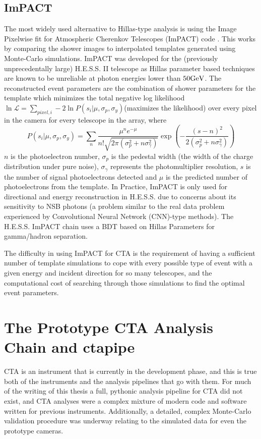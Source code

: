 \subsection{ImPACT}
The most widely used alternative to Hillas-type analysis is using the Image Pixelwise fit for Atmospheric Cherenkov Telescopes (ImPACT) code \cite{impact}. This works by comparing the shower images to interpolated templates generated using Monte-Carlo simulations. ImPACT was developed for the (previously unprecedentally large) H.E.S.S. II telescope as Hillas parameter based techniques are known to be unreliable at photon energies lower than $50\rm{Ge}V$.  The reconstructed event parameters are the combination of shower parameters for the template which minimizes the total negative log likelihood $\ln\mathcal{L}=\sum_{pixel,i}-2\ln{P(s_i|\mu,\sigma_p,\sigma_y)}$(maximizes the likelihood) over every pixel in the camera for every telescope in the array, where
\begin{equation}
P(s_i|\mu,\sigma_p,\sigma_y)=\sum_n \frac{\mu^n e^{-\mu}}{n!\sqrt{2\pi (\sigma_p^2+n\sigma_{\gamma}^2)}} \exp \left(-\frac{(s-n)^2}{2(\sigma_p^2 + n \sigma_{\gamma}^2)} \right)
\end{equation}
$n$ is the photoelectron number, $\sigma_p$ is the pedestal width (the width of the charge distribution under pure noise), $\sigma_{\gamma}$ represents the photomultiplier resolution, $s$ is the number of signal photoelectrons detected and $\mu$ is the predicted number of photoelectrons from the template. In Practice, ImPACT is only used for directional and energy reconstruction in H.E.S.S. due to concerns about its sensitivity to NSB photons (a problem similar to the real data problem experienced by Convolutional Neural Network (CNN)-type methods). The H.E.S.S. ImPACT chain uses a BDT based on Hillas Parameters for gamma/hadron separation.

The difficulty in using ImPACT for CTA is the requirement of having a sufficient number of template simulations to cope with every possible type of event with a given energy and incident direction for so many telescopes, and the computational cost of searching through those simulations to find the optimal event parameters.

\section{The Prototype CTA Analysis Chain and ctapipe}

CTA is an instrument that is currently in the development phase, and this is true both of the instruments and the analysis pipelines that go with them. For much of the writing of this thesis a full, pythonic analysis pipeline for CTA did not exist, and CTA analyses were a complex mixture of modern code and software written for previous instruments. Additionally, a detailed, complex Monte-Carlo validation procedure was underway relating to the simulated data for even the prototype cameras.

